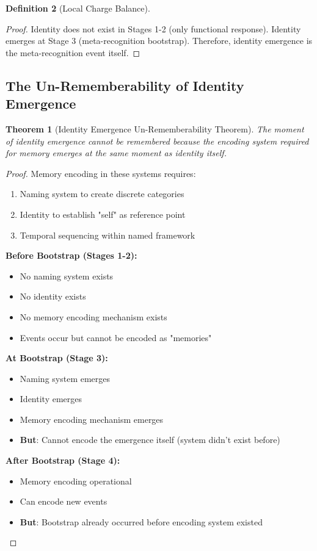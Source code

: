 \documentclass[12pt,a4paper]{article}
\theoremstyle{plain}
\newtheorem{theorem}{Theorem}[section]
\theoremstyle{definition}
\newtheorem{definition}[theorem]{Definition}
\theoremstyle{remark}
\begin{document}
\begin{definition}[Local Charge Balance]
\begin{proof}
Identity does not exist in Stages 1-2 (only functional response). Identity emerges at Stage 3 (meta-recognition bootstrap). Therefore, identity emergence is the meta-recognition event itself.
\end{proof}

\subsection{The Un-Rememberability of Identity Emergence}

\begin{theorem}[Identity Emergence Un-Rememberability Theorem]
The moment of identity emergence cannot be remembered because the encoding system required for memory emerges at the same moment as identity itself.
\end{theorem}

\begin{proof}
Memory encoding in these systems requires:
\begin{enumerate}
\item Naming system to create discrete categories
\item Identity to establish "self" as reference point
\item Temporal sequencing within named framework
\end{enumerate}

\textbf{Before Bootstrap (Stages 1-2):}
\begin{itemize}
\item No naming system exists
\item No identity exists
\item No memory encoding mechanism exists
\item Events occur but cannot be encoded as "memories"
\end{itemize}

\textbf{At Bootstrap (Stage 3):}
\begin{itemize}
\item Naming system emerges
\item Identity emerges
\item Memory encoding mechanism emerges
\item \textbf{But}: Cannot encode the emergence itself (system didn't exist before)
\end{itemize}

\textbf{After Bootstrap (Stage 4):}
\begin{itemize}
\item Memory encoding operational
\item Can encode new events
\item \textbf{But}: Bootstrap already occurred before encoding system existed
\end{itemize}


\end{proof}
\end{definition}
\end{document}
